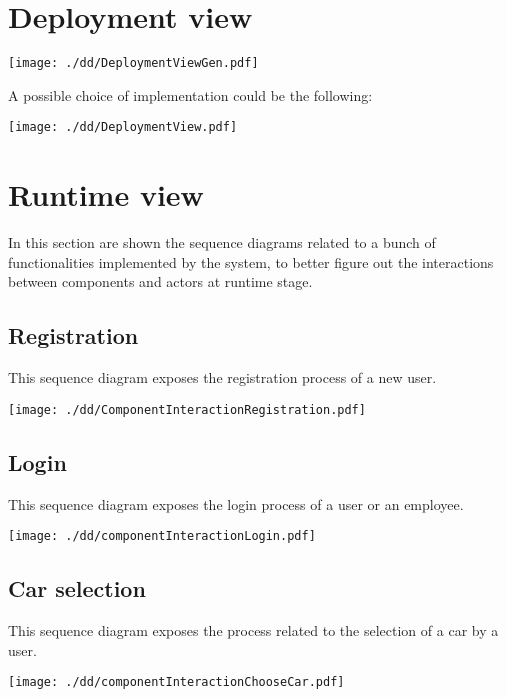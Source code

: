 \documentclass{scrreprt}
\begin{document}
\section{Deployment view}

\begin{center}
	\texttt{[image: ./dd/DeploymentViewGen.pdf]}
\end{center}


A possible choice of implementation could be the following: 

\begin{center}
	\texttt{[image: ./dd/DeploymentView.pdf]}
\end{center}

\section{Runtime view}
In this section are shown the sequence diagrams related to a bunch of functionalities implemented by the system, to better figure out the interactions between components and actors at runtime stage.

\subsection{Registration}
This sequence diagram exposes the registration process of a new user.
\begin{center}
		\texttt{[image: ./dd/ComponentInteractionRegistration.pdf]}
\end{center}
\newpage
\subsection{Login}
This sequence diagram exposes the login process of a user or an employee.
\begin{center}
		\texttt{[image: ./dd/componentInteractionLogin.pdf]}
\end{center}
\newpage
\subsection{Car selection}
This sequence diagram exposes the process related to the selection of a car by a user.
\begin{center}
		\texttt{[image: ./dd/componentInteractionChooseCar.pdf]}
\end{center}
\newpage
\end{document}
